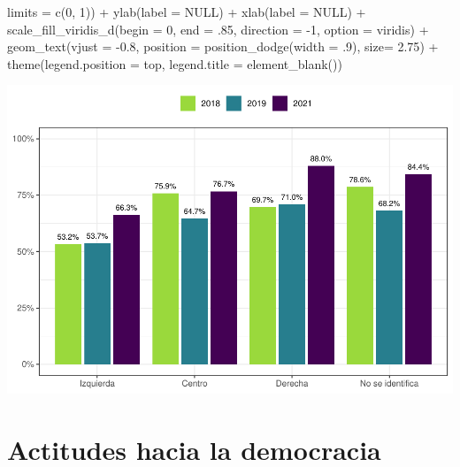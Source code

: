 \documentclass[
  12pt,
]{book}
\newenvironment{Shaded}{\begin{snugshade}}{\end{snugshade}}
\newcommand{\AttributeTok}[1]{\textcolor[rgb]{0.77,0.63,0.00}{#1}}
\newcommand{\ConstantTok}[1]{\textcolor[rgb]{0.00,0.00,0.00}{#1}}
\newcommand{\DecValTok}[1]{\textcolor[rgb]{0.00,0.00,0.81}{#1}}
\newcommand{\FloatTok}[1]{\textcolor[rgb]{0.00,0.00,0.81}{#1}}
\newcommand{\FunctionTok}[1]{\textcolor[rgb]{0.00,0.00,0.00}{#1}}
\newcommand{\NormalTok}[1]{#1}
\newcommand{\SpecialCharTok}[1]{\textcolor[rgb]{0.00,0.00,0.00}{#1}}
\newcommand{\StringTok}[1]{\textcolor[rgb]{0.31,0.60,0.02}{#1}}
\begin{document}
\begin{Shaded}
\begin{Highlighting}[]
                       \AttributeTok{limits =} \FunctionTok{c}\NormalTok{(}\DecValTok{0}\NormalTok{, }\DecValTok{1}\NormalTok{)) }\SpecialCharTok{+}
    \FunctionTok{ylab}\NormalTok{(}\AttributeTok{label =} \ConstantTok{NULL}\NormalTok{) }\SpecialCharTok{+}
    \FunctionTok{xlab}\NormalTok{(}\AttributeTok{label =} \ConstantTok{NULL}\NormalTok{) }\SpecialCharTok{+}
    \FunctionTok{scale\_fill\_viridis\_d}\NormalTok{(}\AttributeTok{begin =} \DecValTok{0}\NormalTok{, }\AttributeTok{end =}\NormalTok{ .}\DecValTok{85}\NormalTok{, }\AttributeTok{direction =} \SpecialCharTok{{-}}\DecValTok{1}\NormalTok{, }\AttributeTok{option =} \StringTok{\textquotesingle{}viridis\textquotesingle{}}\NormalTok{) }\SpecialCharTok{+}
    \FunctionTok{geom\_text}\NormalTok{(}\AttributeTok{vjust =} \SpecialCharTok{{-}}\FloatTok{0.8}\NormalTok{,}
              \AttributeTok{position =} \FunctionTok{position\_dodge}\NormalTok{(}\AttributeTok{width =}\NormalTok{ .}\DecValTok{9}\NormalTok{),}
              \AttributeTok{size=} \FloatTok{2.75}\NormalTok{) }\SpecialCharTok{+}
    \FunctionTok{theme}\NormalTok{(}\AttributeTok{legend.position =} \StringTok{\textquotesingle{}top\textquotesingle{}}\NormalTok{,}
          \AttributeTok{legend.title =} \FunctionTok{element\_blank}\NormalTok{())}
\end{Highlighting}
\end{Shaded}

\includegraphics{reporte-elsoc_files/figure-latex/unnamed-chunk-22-1.pdf}

\hypertarget{actitudes-hacia-la-democracia}{%
\chapter{Actitudes hacia la democracia}\label{actitudes-hacia-la-democracia}}
\end{document}

